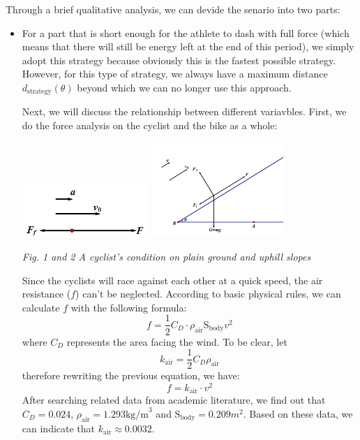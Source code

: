 \documentclass{article}
\begin{document}
			Through a brief qualitative analysis, we can devide the senario into two parts:
			\begin{itemize}
				\item For a part that is short enough for the athlete to dash with full force (which means that there will still be energy left at the end of this period), we simply adopt this strategy because obviously this is the fastest possible strategy. However, for this type of strategy, we always have a maximum distance \(d_{\mathrm{strategy}}\left(\theta\right)\) beyond which we can no longer use this approach.


					Next, we will discuss the relationship between different variavbles. First, we do the force analysis on the cyclist and the bike as a whole:

					\begin{center}
						\includegraphics[height=2cm]{4.png}
						\includegraphics[width=5cm]{5.png}

						\small \textit{Fig. 1 and 2 A cyclist's condition on plain ground and uphill slopes}
					\end{center}

					Since the cyclists will race against each other at a quick speed, the air resistance ($f$) can't be neglected. According to basic physical rules, we can calculate \(f\) with the following formula:
					$$f=\dfrac{1}{2}  C _ D  \cdot \rho_\mathrm{air} \mathrm{S}_\mathrm{body} v^2$$
					where \(C_D\) represents the area facing the wind. To be clear, let
					$$ k _\mathrm{air}=\dfrac{1}{2}  C _ D  \rho_\mathrm{air}$$
					therefore rewriting the previous equation, we have:
					$$f= k _\mathrm{air}\cdot v^2$$
					After searching related data from academic literature, we find out that $ C _ D =0.024$, $\rho_\mathrm{air}=1.293 \mathrm{kg/m}^3$ and $\mathrm{S}_\mathrm{body}=0.209 m^2$. Based on these data, we can indicate that $ k _\mathrm{air}\approx0.0032$.


\end{itemize}
\end{document}
